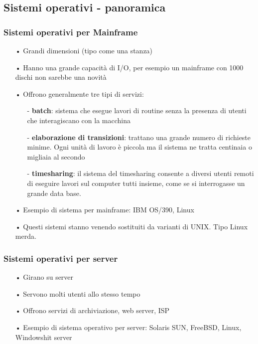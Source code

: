 \documentclass{article}
\begin{document}
\newpage
\subsection{Sistemi operativi - panoramica}

\subsubsection{Sistemi operativi per Mainframe}
\begin{enumerate}
   \item[•] Grandi dimensioni (tipo come una stanza)
   \item[•] Hanno una grande capacità di I/O, per esempio un mainframe con 1000 dischi non sarebbe una novità
   \item[•] Offrono generalmente tre tipi di servizi:
      \begin{enumerate}
         \item[-] \textbf{batch}: sistema che esegue lavori di routine senza la presenza di utenti che interagiscano con la macchina 
         \item[-] \textbf{elaborazione di transizioni}: trattano una grande numero di richieste minime. Ogni unità di lavoro è piccola ma il sistema ne tratta centinaia o migliaia al secondo
         \item[-] \textbf{timesharing}: il sistema del timesharing consente a diversi utenti remoti di eseguire lavori sul computer tutti insieme, come se si interrogasse un grande data base.
      \end{enumerate}
   \item[•] Esempio di sistema per mainframe: IBM OS/390, Linux 
   \item[•] Questi sistemi stanno venendo sostituiti da varianti di UNIX. Tipo Linux merda.
\end{enumerate}

\subsubsection{Sistemi operativi per server}
\begin{enumerate}
   \item[•] Girano su server
   \item[•] Servono molti utenti allo stesso tempo 
   \item[•] Offrono servizi di archiviazione, web server, ISP
   \item[•] Esempio di sistema operativo per server: Solaris SUN, FreeBSD, Linux, Windowshit server
\end{enumerate}
\end{document}
